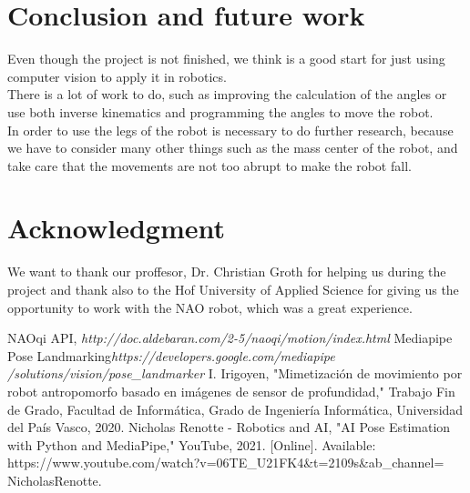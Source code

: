 \documentclass[conference]{IEEEtran}
\begin{document}
\section{Conclusion and future work}
Even though the project is not finished, we think is a good start for just using computer vision to apply it in robotics.
\\
There is a lot of work to do, such as improving the calculation of the angles or use both inverse kinematics and programming the angles to move the robot.
\\
In order to use the legs of the robot is necessary to do further research, because we have to consider many other things such as the mass center of the robot, and take care that the movements are not too abrupt to make the robot fall.

\section*{Acknowledgment}
We want to thank our proffesor, Dr. Christian Groth for helping us during the project and thank also to the Hof University of Applied Science for giving us the opportunity to work with the NAO robot, which was a great experience.



\begin{thebibliography}{00}

 NAOqi API, \textit{http://doc.aldebaran.com/2-5/naoqi/motion/index.html}
 Mediapipe Pose Landmarking\textit{https://developers.google.com/mediapipe
/solutions/vision/pose\_landmarker}
I. Irigoyen, "Mimetización de movimiento por robot antropomorfo basado en imágenes de sensor de profundidad," Trabajo Fin de Grado, Facultad de Informática, Grado de Ingeniería Informática, Universidad del País Vasco, 2020.
 Nicholas Renotte - Robotics and AI, "AI Pose Estimation with Python and MediaPipe," YouTube, 2021. [Online]. Available: https://www.youtube.com/watch?v=06TE\_U21FK4&t=2109s&ab\_channel=
NicholasRenotte.


\end{thebibliography}
\end{document}
